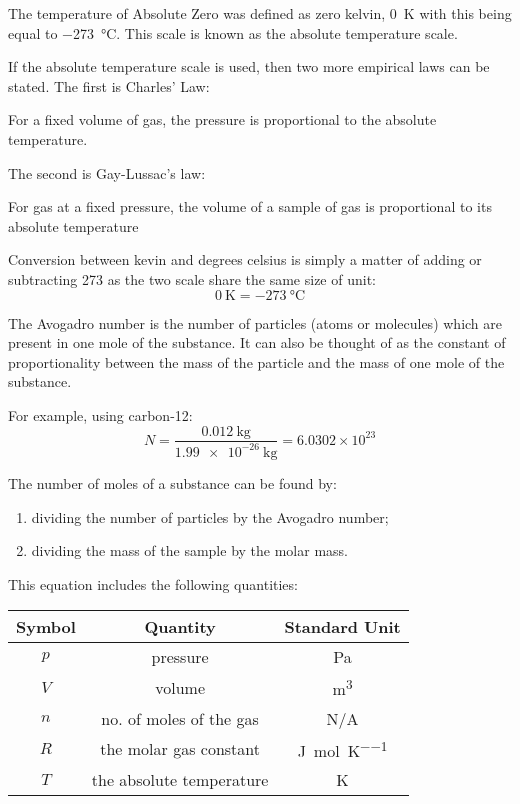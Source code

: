 \documentclass[main.tex]{subfiles}
\begin{document}
The temperature of Absolute Zero was defined as zero kelvin, \SI{0}{\kelvin} with this being equal to \SI{-273}{\celsius}. This scale is known as the absolute temperature scale.

If the absolute temperature scale is used, then two more empirical laws can be stated. The first is Charles' Law:

\begin{center}
For a fixed volume of gas, the pressure is proportional to the absolute temperature.
\end{center}

The second is Gay-Lussac's law:

\begin{center}
For gas at a fixed pressure, the volume of a sample of gas is proportional to its absolute temperature
\end{center}


Conversion between kevin and degrees celsius is simply a matter of adding or subtracting 273 as the two scale share the same size of unit:
$$ \SI{0}{\kelvin} = \SI{-273}{\celsius}$$


The Avogadro number is the number of particles (atoms or molecules) which are present in one mole of the substance. It can also be thought of as the constant of proportionality between the mass of the particle and the mass of one mole of the substance.

For example, using carbon-12:
$$ N = \frac{\SI{0.012}{\kilo\gram}}{\SI{1.99e-26}{\kilo\gram}} = 6.0302\times10^{23}$$

The number of moles of a substance can be found by:
\begin{enumerate}
\item dividing the number of particles by the Avogadro number;
\item dividing the mass of the sample by the molar mass.
\end{enumerate}


This equation includes the following quantities:

\begin{center}\begin{tabular}{ccc}
Symbol & Quantity & Standard Unit \\ \hline
$p$ & pressure & \si{\pascal} \\
$V$ & volume & \si{\metre^3} \\
$n$ & no. of moles of the gas & N/A \\
$R$ & the molar gas constant & \si{\joule\per\mole\per\kelvin} \\
$T$ & the absolute temperature & \si{\kelvin} \\
\end{tabular}\end{center}
\end{document}
